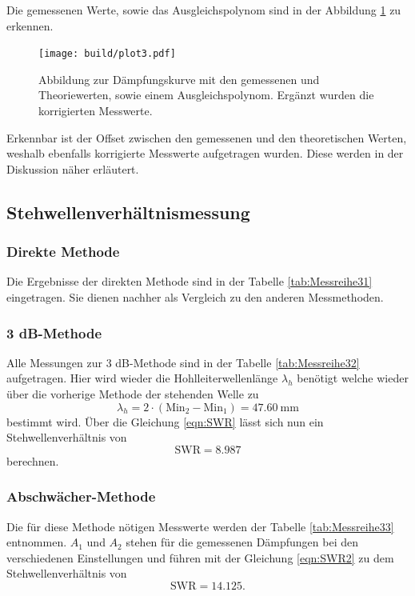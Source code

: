 Die gemessenen Werte, sowie das Ausgleichspolynom sind in der Abbildung \ref{111} zu erkennen.
\begin{figure}
    \centering
    \texttt{[image: build/plot3.pdf]}
    \caption{Abbildung zur Dämpfungskurve mit den gemessenen und Theoriewerten, sowie einem Ausgleichspolynom. Ergänzt wurden die korrigierten Messwerte.} 
    \label{111}
\end{figure}
Erkennbar ist der Offset zwischen den gemessenen und den theoretischen Werten, weshalb ebenfalls korrigierte Messwerte aufgetragen wurden. Diese werden in der Diskussion näher
erläutert.

\subsection{Stehwellenverhältnismessung}

\subsubsection{Direkte Methode}
Die Ergebnisse der direkten Methode sind in der Tabelle \ref{tab:Messreihe31} eingetragen. Sie dienen nachher als Vergleich zu den anderen Messmethoden.

\subsubsection{3 dB-Methode}
Alle Messungen zur 3 dB-Methode sind in der Tabelle \ref{tab:Messreihe32} aufgetragen. Hier wird wieder die Hohlleiterwellenlänge $\lambda_h$ 
benötigt welche wieder über die vorherige Methode der stehenden Welle zu
\begin{equation}
\lambda_h = 2 \cdot (\text{Min}_2 - \text{Min}_1) = \SI{47.60}{\milli\meter}
\end{equation}
bestimmt wird.
Über die Gleichung \ref{eqn:SWR} lässt sich nun ein Stehwellenverhältnis von
\begin{equation}
\text{SWR} = 8.987
\end{equation}
berechnen.

\subsubsection{Abschwächer-Methode}
Die für diese Methode nötigen Messwerte werden der Tabelle \ref{tab:Messreihe33} entnommen.
$A_1$ und $A_2$ stehen für die gemessenen Dämpfungen bei den verschiedenen Einstellungen und führen mit der Gleichung 
\eqref{eqn:SWR2} zu dem Stehwellenverhältnis von
\begin{equation}
\text{SWR} = 14.125.
\end{equation}
